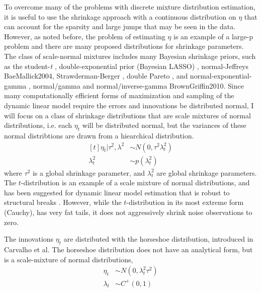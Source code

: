 \documentclass{article}
\begin{document}
To overcome many of the problems with discrete mixture distribution estimation, it is useful to use the shrinkage approach with a continuous distribution on $\eta$ that can account for the sparsity and large jumps that may be seen in the data.
However, as noted before, the problem of estimating $\eta$ is an example of a large-p problem and there are many proposed distributions for shrinkage parameters.
The class of scale-normal mixtures includes many Bayesian shrinkage priors, such as the student-\textit{t} \parencite{Tipping2001}, double-exponential prior (Bayesian LASSO) \parencites{LiGoel2006}{ParkCasella2008}{Hans2009}, normal-Jeffreys \parencite{FigueiredoMember2003}{BaeMallick2004}, Strawderman-Berger \parencites{Strawderman1971}{Berger1980}, double Pareto \parencite{ArmaganDunsonLee2011},  and normal-exponential-gamma \parencite{BrownGriffin2005}, normal/gamma and normal/inverse-gamma \parencite{CaronDoucet2008}{BrownGriffin2010}.
Since many computationally efficient forms of maximization and sampling of the dynamic linear model require the errors and innovations be distributed normal, I will focus on a class of shrinkage distributions that are scale mixtures of normal distributions, i.e. each $\eta_{t}$ will be distributed normal, but the variances of these normal distribtions are drawn from a hiearchical distribution.
\begin{equation}
  \label{eq:6}
  \begin{aligned}[t]
    \eta_{t} | \tau^{2}, \lambda^{2} & \sim N(0, \tau^{2} \lambda_{t}^{2}) \\
    \lambda_{t}^{2} & \sim p(\lambda^{2}_{t})
  \end{aligned}
\end{equation}
where $\tau^{2}$ is a global shrinkage parameter, and $\lambda_{t}^{2}$ are global shrinkage parameters.
The $t$-distribution is an example of a scale mixture of normal distributions, and has been suggested for dynamic linear model estimation that is robust to structural breaks \parencites{HarveyKoopman2000}{PetrisPetroneEtAl2009}.
However, while the $t$-distribution in its most extreme form (Cauchy), has very fat tails, it does not aggressively shrink noise observations to zero.

The innovations $\eta_{t}$ are distributed with the horseshoe distribution, introduced in Carvalho et al.
The horseshoe distribution does not have an analytical form, but is a scale-mixture of normal distributions,
\begin{align}
  \label{eq:12}
  \eta_{t} &\sim N(0, \lambda_{t}^{2} \tau^{2}) \\
  \label{eq:13}
  \lambda_{t} &\sim C^{+}(0, 1)
\end{align}
\end{document}
